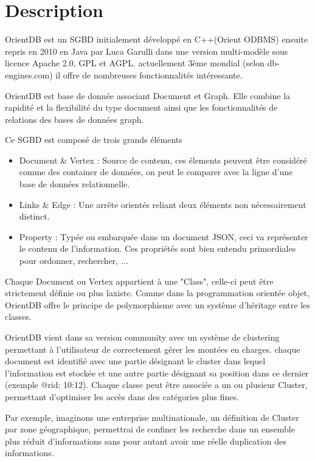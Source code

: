\documentclass[a4paper,fleqn,12pt]{report}
\begin{document}
\section{Description}

OrientDB est un SGBD initialement développé en C++(Orient ODBMS) ensuite repris en 2010 en Java par Luca Garulli dans une version multi-modèle sous licence Apache 2.0, GPL et AGPL. actuellement 3ème mondial (selon db-engines.com) il offre de nombreuses fonctionnalités intéressante. 

OrientDB est base de donnée associant Document et Graph. Elle combine la rapidité et la flexibilité du type document ainsi que les fonctionnalités de relations des bases de données graph. 

Ce SGBD est composé de trois grands éléments 

\begin{itemize}
\item Document \& Vertex : Source de contenu, ces élements peuvent être considéré comme des container de données, on peut le comparer avec la ligne d'une base de données relationnelle.
\item Links \& Edge : Une arrête orientés reliant deux éléments non nécessairement distinct.
\item Property : Typée ou embarquée dans un document JSON, ceci va représenter le contenu de l'information. Ces propriétés sont bien entendu primordiales pour ordonner, rechercher, ...
\end{itemize}

Chaque Document ou Vertex appartient à une "Class", celle-ci peut être strictement définie ou plus laxiste. Comme dans la programmation orientée objet, OrientDB offre le principe de polymorphisme avec un système d'héritage entre les classes. 

OrientDB vient dans sa version community avec un système de clustering permettant à l'utilisateur de correctement gérer les montées en charges. chaque document est identifié avec une partie désignant le cluster dans lequel l'information est stockée et une autre partie désignant sa position dans ce dernier (exemple @rid: 10:12). Chaque classe peut être associée a un ou plusieur Cluster, permettant d'optimiser les accès dans des catégories plus fines.

Par exemple, imaginons une entreprise multinationale, un définition de Cluster par zone géographique, permettrai de confiner les recherche dans un ensemble plus réduit d'informations sans pour autant avoir une réelle duplication des informations. 
\end{document}

